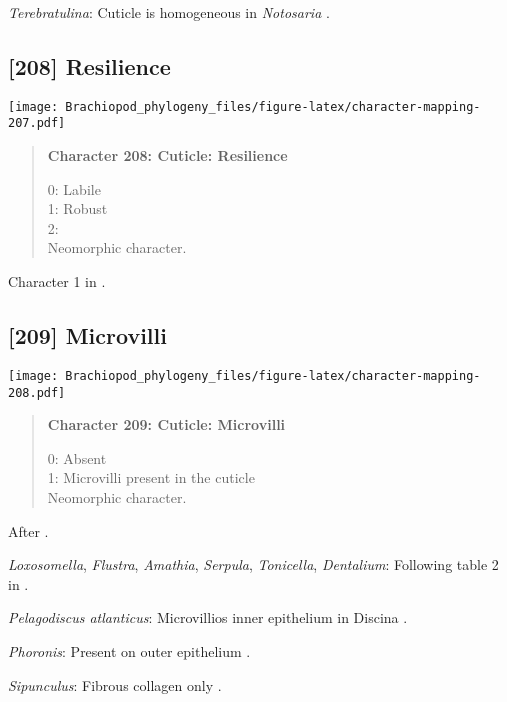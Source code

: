\documentclass[openany]{book}
\theoremstyle{definition}
\theoremstyle{definition}
\theoremstyle{definition}
\theoremstyle{remark}
\begin{document}
\hypertarget{Terebratulina-coding-207}{}
\emph{Terebratulina}: Cuticle is homogeneous in \emph{Notosaria}
\citep{BereiterHahn1984, Williams1997Introduction}.

\subsection*{{[}208{]} Resilience}\label{resilience}

\texttt{[image: Brachiopod\_phylogeny\_files/figure-latex/character-mapping-207.pdf]}

\begin{quote}
\textbf{Character 208: Cuticle: Resilience}

0: Labile\\
1: Robust\\
2:\\
Neomorphic character.
\end{quote}

Character 1 in \citet{Haszprunar2000}.

\subsection*{{[}209{]} Microvilli}\label{microvilli}

\texttt{[image: Brachiopod\_phylogeny\_files/figure-latex/character-mapping-208.pdf]}

\begin{quote}
\textbf{Character 209: Cuticle: Microvilli}

0: Absent\\
1: Microvilli present in the cuticle\\
Neomorphic character.
\end{quote}

After \citet{Borisanova2015}.

\hypertarget{Amathia-coding-209}{}
\emph{Loxosomella}, \emph{Flustra}, \emph{Amathia}, \emph{Serpula},
\emph{Tonicella}, \emph{Dentalium}: Following table 2 in
\citet{Borisanova2015}.

\hypertarget{Pelagodiscus_atlanticus-coding-209}{}
\emph{Pelagodiscus atlanticus}: Microvillios inner epithelium in Discina
\citep{Williams1997Introduction}.

\hypertarget{Phoronis-coding-209}{}
\emph{Phoronis}: Present on outer epithelium \citep{BereiterHahn1984}.

\hypertarget{Sipunculus-coding-209}{}
\emph{Sipunculus}: Fibrous collagen only \citep{BereiterHahn1984}.
\end{document}

